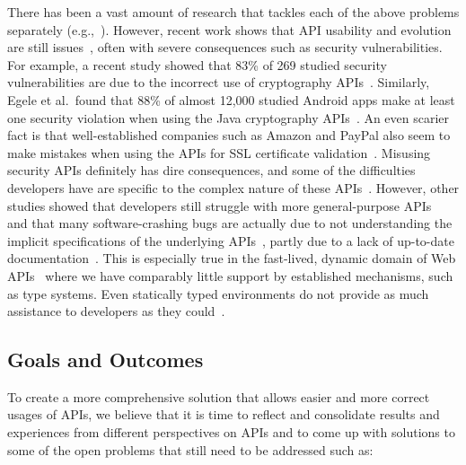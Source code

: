 \documentclass[10pt, conference]{IEEEtran}
\newcommand{\updated}[1]{#1}
\begin{document}
There has been a vast amount of research that tackles each of the above problems separately (e.g.,~\cite{Subramanian:2014,RobillardInferenceSurvey,RobillardLearn09, NNP+09, ThungLibRec}). However, recent work shows that API usability and evolution are still issues~\cite{NKMB16, BKHT:FSE16, SunshineAPIProtocol}, often with severe consequences such as security vulnerabilities. For example, a recent study showed that 83\% of 269 studied security vulnerabilities are due to the incorrect use of cryptography APIs~\cite{Lazar2014}. Similarly, Egele et al.~found that 88\% of almost 12,000 studied Android apps make at least one security violation when using the Java cryptography APIs~\cite{EgeleBFK13}. An even scarier fact is that well-established companies such as Amazon and PayPal also seem to make mistakes when using the APIs for SSL certificate validation~\cite{GeorgievIJABS12}. Misusing security APIs definitely has dire consequences, and some of the difficulties developers have are specific to the complex nature of these APIs~\cite{NKMB16}. However, other studies showed that developers still struggle with more general-purpose APIs~\cite{SunshineAPIProtocol} and that many software-crashing bugs are actually due to not understanding the implicit specifications of the underlying APIs~\cite{amani2016mubench}\updated{, partly due to a lack of up-to-date documentation~\cite{RMS17}. This is especially true in the fast-lived, dynamic domain of Web APIs~\cite{WYZ+17} where we have comparably little support by established mechanisms, such as type systems. Even statically typed environments do not provide as much assistance to developers as they could~\cite{KS17}.}

\subsection{Goals and Outcomes}\label{sec:goals}
To create a more comprehensive solution that allows easier and more correct usages of APIs, we believe that it is time to reflect and consolidate results and experiences from different perspectives on APIs and to come up with solutions to some of the open problems that still need to be addressed such as:
\end{document}
